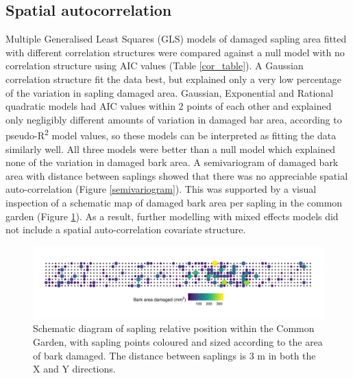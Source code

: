 \documentclass[a4paper, 11pt]{article}
\begin{document}
\subsection*{Spatial autocorrelation}

Multiple Generalised Least Squares (GLS) models of damaged sapling area fitted with different correlation structures were compared against a null model with no correlation structure using AIC values (Table \ref{cor_table}). A Gaussian correlation structure fit the data best, but explained only a very low percentage of the variation in sapling damaged area. Gaussian, Exponential and Rational quadratic models had AIC values within 2 points of each other and explained only negligibly different amounts of variation in damaged bar area, according to pseudo-R\textsuperscript{2} model values, so these models can be interpreted as fitting the data similarly well. All three models were better than a null model which explained none of the variation in damaged bark area. A semivariogram of damaged bark area with distance between saplings showed that there was no appreciable spatial auto-correlation (Figure \ref{semivariogram}). This was supported by a visual inspection of a schematic map of damaged bark area per sapling in the common garden (Figure \ref{sapling_map}). As a result, further modelling with mixed effects models did not include a spatial auto-correlation covariate structure.

\begin{figure}
	\includegraphics[width=\textwidth]{sapling_map}
	\caption{Schematic diagram of sapling relative position within the Common Garden, with sapling points coloured and sized according to the area of bark damaged. The distance between saplings is 3 m in both the X and Y directions.}
	\label{sapling_map}
\end{figure}
\end{document}
